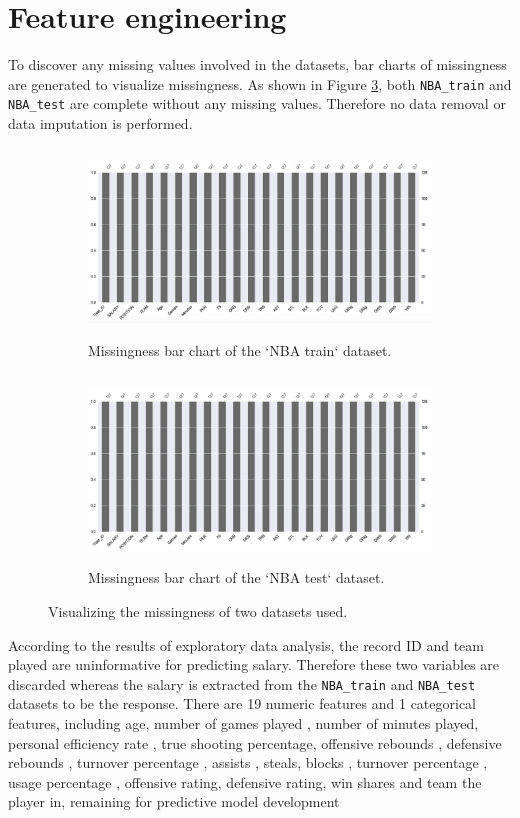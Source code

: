 \documentclass[letterpaper,12pt,twoside,]{pinp}
\begin{document}
\hypertarget{feature-engineering}{%
\section{Feature engineering}\label{feature-engineering}}

To discover any missing values involved in the datasets, bar charts of
missingness are generated to visualize missingness. As shown in Figure
\ref{fig:missingness}, both \texttt{NBA\_train} and \texttt{NBA\_test}
are complete without any missing values. Therefore no data removal or
data imputation is performed.

\begin{figure}[H]
\begin{subfigure}{0.55\textwidth}
\includegraphics[width=0.9\linewidth, height=5cm]{nbaTrain_miss.png} 
\caption{Missingness bar chart of the `NBA train` dataset.}
\label{fig:trainMiss}
\end{subfigure}
\begin{subfigure}{0.55\textwidth}
\includegraphics[width=0.9\linewidth, height=5cm]{nbaTest_miss.png}
\caption{Missingness bar chart of the `NBA test` dataset.}
\label{fig:testMiss}
\end{subfigure}
\caption{Visualizing the missingness of two datasets used.}
\label{fig:missingness}
\end{figure}

According to the results of exploratory data analysis, the record ID and
team played are uninformative for predicting salary. Therefore these two
variables are discarded whereas the salary is extracted from the
\texttt{NBA\_train} and \texttt{NBA\_test} datasets to be the response.
There are 19 numeric features and 1 categorical features, including age,
number of games played , number of minutes played, personal efficiency
rate , true shooting percentage, offensive rebounds , defensive rebounds
, turnover percentage , assists , steals, blocks , turnover percentage ,
usage percentage , offensive rating, defensive rating, win shares and
team the player in, remaining for predictive model development
\end{document}
